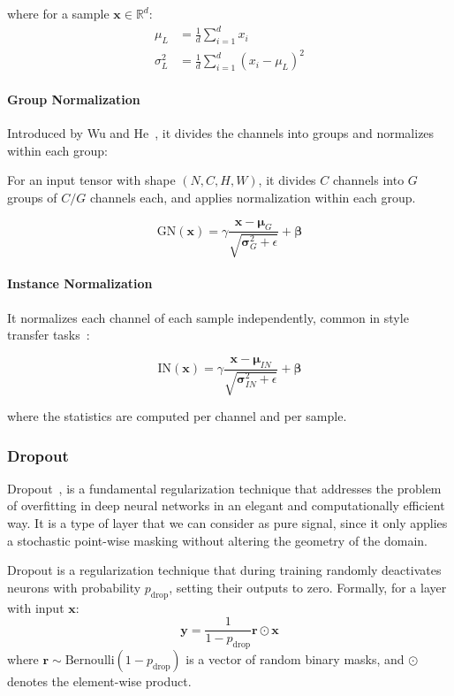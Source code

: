 where for a sample $\mathbf{x} \in \mathbb{R}^d$:
\begin{align}
\mu_L &= \frac{1}{d} \sum_{i=1}^d x_i \\
\sigma^2_L &= \frac{1}{d} \sum_{i=1}^d (x_i - \mu_L)^2
\end{align}

\paragraph{Group Normalization}

Introduced by Wu and He~\citep{wu2018group}, it divides the channels into groups and normalizes within each group:

For an input tensor with shape $(N, C, H, W)$, it divides $C$ channels into $G$ groups of $C/G$ channels each, and applies normalization within each group.

\[
\text{GN}(\mathbf{x}) = \gamma \frac{\mathbf{x} - \boldsymbol{\mu}_G}{\sqrt{\boldsymbol{\sigma}^2_G + \epsilon}} + \boldsymbol{\beta}
\]

\paragraph{Instance Normalization}

It normalizes each channel of each sample independently, common in style transfer tasks~\citep{ulyanov2016instance}:

\[
\text{IN}(\mathbf{x}) = \gamma \frac{\mathbf{x} - \boldsymbol{\mu}_{IN}}{\sqrt{\boldsymbol{\sigma}^2_{IN} + \epsilon}} + \boldsymbol{\beta}
\]

where the statistics are computed per channel and per sample.

\subsubsection{Dropout}

Dropout~\citep{srivastava2014dropout}, is a fundamental regularization technique that addresses the problem of overfitting in deep neural networks in an elegant and computationally efficient way. It is a type of layer that we can consider as pure signal, since it only applies a stochastic point-wise masking without altering the geometry of the domain.

\begin{definition}[Dropout]\label{def:dropout}
	Dropout is a regularization technique that during training randomly deactivates neurons with probability $p_{\text{drop}}$, setting their outputs to zero. Formally, for a layer with input $\mathbf{x}$:
	\[
	\mathbf{y} = \frac{1}{1-p_{\text{drop}}} \mathbf{r} \odot \mathbf{x}
	\]
	where $\mathbf{r} \sim \text{Bernoulli}(1-p_{\text{drop}})$ is a vector of random binary masks, and $\odot$ denotes the element-wise product.
\end{definition}


